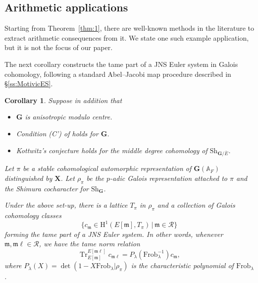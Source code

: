 \documentclass{amsart}
\newtheorem{cor}[theorem]{Corollary}
\theoremstyle{definition}
\theoremstyle{remark}
\newcommand{\1}{\mathbf{1}}
\newcommand{\A}{\mathbb{A}}
\newcommand{\Fr}{\mathrm{Frob}}
\newcommand{\h}{\mathrm{H}}
\newcommand{\m}{\mathfrak{m}}
\newcommand{\mb}[1]{\mathbf{#1}}
\DeclareMathOperator{\Tr}{Tr}
\theoremstyle{definition}
\newcommand{\bG}{\mathbf{G}}
\newcommand{\Sh}{\mathrm{Sh}}
\begin{document}
\subsection{Arithmetic applications}
Starting from Theorem~\ref{thm:1}, there are well-known methods in the literature to extract arithmetic consequences from it. We state one such example application, but it is not the focus of our paper.

The next corollary constructs the tame part of a JNS Euler system in Galois cohomology, following a standard Abel--Jacobi map procedure described in \S\ref{ss:MotivicES}.

\begin{cor}\label{cor:ActualES}
    Suppose in addition that
    \begin{itemize}
        \item $\mb{G}$ is anisotropic modulo centre.
        \item Condition (C') of \cite{MorelSuh} holds for $\mb{G}$.
        \item Kottwitz's conjecture \cite[Conjecture 5.2]{BlasiusRogawski} holds for the middle degree cohomology of $\Sh_{\bG/\bar{E}}$.
    \end{itemize}
    Let $\pi$ be a stable cohomological automorphic representation of $\mb{G}(\A_F)$ distinguished by $\mb{X}$. Let $\rho_\pi$ be the $p$-adic Galois representation attached to $\pi$ and the Shimura cocharacter for $\Sh_\bG$.
    
    Under the above set-up, there is a lattice $T_\pi$ in $\rho_\pi$ and a collection of Galois cohomology classes
    \[
        \{c_\m\in\h^1(E[\m],T_\pi)\,|\,\m\in\mathscr{R}\}
    \]
    forming the tame part of a JNS Euler system. In other words, whenever $\m,\m\ell\in\mathscr{R}$, we have the tame norm relation
    \[
        \Tr_{E[\m]}^{E[\m\ell]}c_{\m\ell}=P_\lambda(\Fr_\lambda^{-1})c_\m,
    \]
    where $P_\lambda(X)=\det(1-X\Fr_\lambda|\rho_\pi)$ is the characteristic polynomial of $\Fr_\lambda$.
\end{cor}
\end{document}
